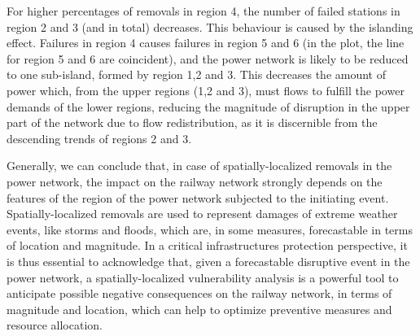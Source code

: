 \documentclass[review]{elsarticle}
\begin{document}
	For higher percentages of removals in region 4, the number of failed stations in region 2 and 3 (and in total) decreases. This behaviour is caused by the islanding effect. Failures in region 4 causes failures in region 5 and 6 (in the plot, the line for region 5 and 6 are coincident), and the power network is likely to be reduced to one sub-island, formed by region 1,2 and 3. This decreases the amount of power which, from the upper regions (1,2 and 3), must flows to fulfill the power demands of the lower regions, reducing the magnitude of disruption in the upper part of the network due to flow redistribution, as it is discernible from the descending trends of regions 2 and 3.
	
	Generally, we can conclude that, in case of spatially-localized removals in the power network, the impact on the railway network strongly depends on the features of the region of the power network subjected to the initiating event. Spatially-localized removals are used to represent damages of extreme weather events, like storms and floods, which are, in some measures, forecastable in terms of location and magnitude. In a critical infrastructures protection perspective, it is thus essential to acknowledge that, given a forecastable disruptive event in the power network, a spatially-localized vulnerability analysis is a powerful tool to anticipate possible negative consequences on the railway network, in terms of magnitude and location, which can help to optimize preventive measures and resource allocation.

\end{document}
